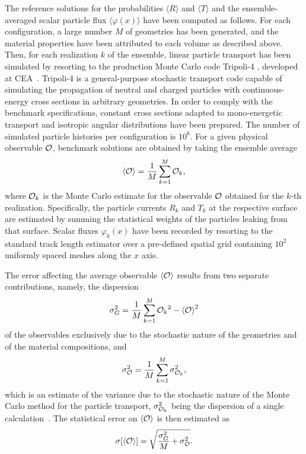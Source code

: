 \documentclass[final,authoryear,5p,times,twocolumn]{elsarticle}
\newcommand{\tripoli}{{\sc Tripoli-4}\textsuperscript{ \textregistered}}
\begin{document}
The reference solutions for the probabilities $\langle R \rangle$ and $\langle T \rangle$ and the ensemble-averaged scalar particle flux $\langle \varphi(x) \rangle$ have been computed as follows. For each configuration, a large number $M$ of geometries has been generated, and the material properties have been attributed to each volume as described above. Then, for each realization $k$ of the ensemble, linear particle transport has been simulated by resorting to the production Monte Carlo code \tripoli{}, developed at CEA~\cite{T4}. \tripoli{} is a general-purpose stochastic transport code capable of simulating the propagation of neutral and charged particles with continuous-energy cross sections in arbitrary geometries. In order to comply with the benchmark specifications, constant cross sections adapted to mono-energetic transport and isotropic angular distributions have been prepared. The number of simulated particle histories per configuration is $10^6$. For a given physical observable ${\cal O}$, benchmark solutions are obtained by taking the ensemble average
\begin{equation}
\langle {\cal O} \rangle = \frac{1}{M} \sum_{k=1}^M {\cal O}_k,
\end{equation}
where ${\cal O}_k$ is the Monte Carlo estimate for the observable ${\cal O}$ obtained for the $k$-th realization. Specifically, the particle currents $R_k$ and $T_k$ at the respective surface are estimated by summing the statistical weights of the particles leaking from that surface. Scalar fluxes $\varphi_k(x)$ have been recorded by resorting to the standard track length estimator over a pre-defined spatial grid containing $10^2$ uniformly spaced meshes along the $x$ axis.

The error affecting the average observable $\langle {\cal O} \rangle$ results from two separate contributions, namely, the dispersion
\begin{equation}
\sigma^2_G = \frac{1}{M} \sum_{k=1}^M {{\cal O}_k}^2 - {\langle {\cal O} \rangle}^2
\end{equation}
of the observables exclusively due to the stochastic nature of the geometries and of the material compositions, and 
\begin{equation}
\sigma^2_{{\cal O}}=\frac{1}{M} \sum_{k=1}^M \sigma_{{\cal O}_k}^2,
\end{equation}
which is an estimate of the variance due to the stochastic nature of the Monte Carlo method for the particle transport, $\sigma_{{\cal O}_k}^2$ being the dispersion of a single calculation~\cite{donovan, sutton}. The statistical error on $\langle {\cal O} \rangle$ is then estimated as
\begin{equation}
\sigma[ \langle {\cal O}\rangle ] = \sqrt{\frac{\sigma^2_G}{M}+\sigma^2_{{\cal O}}}.
\end{equation}
\end{document}
